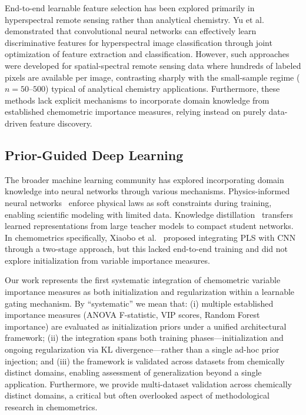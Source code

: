\documentclass[preprint,12pt]{elsarticle}
\begin{document}
End-to-end learnable feature selection has been explored primarily in hyperspectral remote sensing rather than analytical chemistry. Yu et al.~\cite{yu2020band} demonstrated that convolutional neural networks can effectively learn discriminative features for hyperspectral image classification through joint optimization of feature extraction and classification. However, such approaches were developed for spatial-spectral remote sensing data where hundreds of labeled pixels are available per image, contrasting sharply with the small-sample regime ($n=50$--$500$) typical of analytical chemistry applications. Furthermore, these methods lack explicit mechanisms to incorporate domain knowledge from established chemometric importance measures, relying instead on purely data-driven feature discovery.

\subsection{Prior-Guided Deep Learning}

The broader machine learning community has explored incorporating domain knowledge into neural networks through various mechanisms. Physics-informed neural networks~\cite{raissi2019physics} enforce physical laws as soft constraints during training, enabling scientific modeling with limited data. Knowledge distillation~\cite{hinton2015distilling} transfers learned representations from large teacher models to compact student networks. In chemometrics specifically, Xiaobo et al.~\cite{xiaobo2018combination} proposed integrating PLS with CNN through a two-stage approach, but this lacked end-to-end training and did not explore initialization from variable importance measures.

Our work represents the first systematic integration of chemometric variable importance measures as both initialization and regularization within a learnable gating mechanism. By ``systematic'' we mean that: (i) multiple established importance measures (ANOVA F-statistic, VIP scores, Random Forest importance) are evaluated as initialization priors under a unified architectural framework; (ii) the integration spans both training phases---initialization and ongoing regularization via KL divergence---rather than a single ad-hoc prior injection; and (iii) the framework is validated across datasets from chemically distinct domains, enabling assessment of generalization beyond a single application. Furthermore, we provide multi-dataset validation across chemically distinct domains, a critical but often overlooked aspect of methodological research in chemometrics. 
\end{document}
